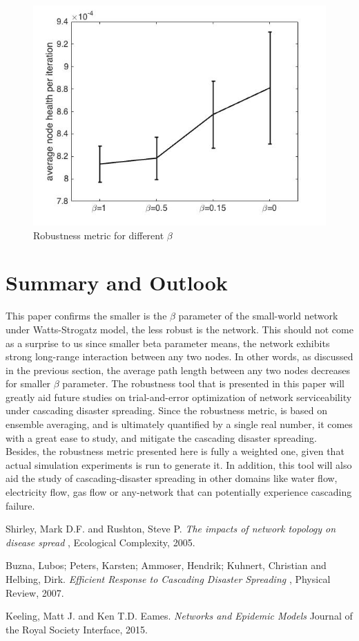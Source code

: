 \documentclass[11pt]{article}
\begin{document}
\begin{figure}[t!]
\centering
\includegraphics[width=0.70\columnwidth]{images/periteration.jpg}
\caption{Robustness metric for different $\beta$}\label{ERROR_BAR}
\end{figure}
\clearpage

\section{Summary and Outlook}
This paper confirms the smaller is the $\beta$ parameter of the small-world network under Watts-Strogatz model, the less robust is the network. This should not come as a surprise to us since smaller beta parameter means, the network exhibits strong long-range interaction between any two nodes. In other words, as discussed in the previous section, the average path length between any two nodes decreases for smaller $\beta$ parameter. The robustness tool that is presented in this paper will greatly aid future studies on trial-and-error optimization of network serviceability under cascading disaster spreading. Since the robustness metric, is based on ensemble averaging, and is ultimately quantified by a single real number, it comes with a great ease to study, and mitigate the cascading disaster spreading. Besides, the robustness metric presented here is fully a weighted one, given that actual simulation experiments is run to generate it. In addition, this tool will also aid the study of cascading-disaster spreading in other domains like water flow, electricity flow, gas flow or any-network that can potentially experience cascading failure.

\newpage
\begin{thebibliography}{9}
 Shirley, Mark D.F. and Rushton, Steve P. \textit{ The impacts of network topology on disease spread }, Ecological Complexity, 2005.

 Buzna, Lubos; Peters, Karsten; Ammoser, Hendrik;  Kuhnert, Christian and Helbing, Dirk.\textit{ Efficient Response to Cascading Disaster Spreading }, Physical Review, 2007.

Keeling, Matt J. and Ken T.D. Eames. \textit{ Networks and Epidemic Models } Journal of the Royal Society Interface, 2015.

\end{thebibliography}
\end{document}

